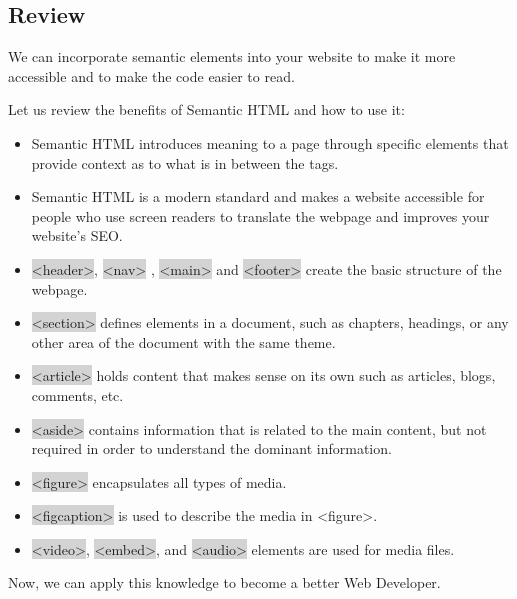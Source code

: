 \documentclass[11pt]{article}
\begin{document}
\subsection{Review}
We can incorporate semantic elements into your website to make it more accessible and to make the code easier to read.

Let us review the benefits of Semantic HTML and how to use it:
\begin{itemize}[leftmargin = *]
\item Semantic HTML introduces meaning to a page through specific elements that provide context as to what is in between the tags.
\item Semantic HTML is a modern standard and makes a website accessible for people who use screen readers to translate the webpage and improves your website’s SEO.
\item \colorbox{lightgray}{<header>}, \colorbox{lightgray}{<nav>} , \colorbox{lightgray}{<main>} and \colorbox{lightgray}{<footer>} create the basic structure of the webpage.
\item \colorbox{lightgray}{<section>} defines elements in a document, such as chapters, headings, or any other area of the document with the same theme.
\item \colorbox{lightgray}{<article>} holds content that makes sense on its own such as articles, blogs, comments, etc.
\item \colorbox{lightgray}{<aside>} contains information that is related to the main content, but not required in order to understand the dominant information.
\item \colorbox{lightgray}{<figure>} encapsulates all types of media.
\item \colorbox{lightgray}{<figcaption>} is used to describe the media in <figure>.
\item \colorbox{lightgray}{<video>}, \colorbox{lightgray}{<embed>}, and \colorbox{lightgray}{<audio>} elements are used for media files.
\end{itemize}
Now, we can apply this knowledge to become a better Web Developer.
\end{document}
